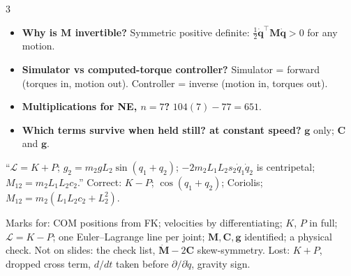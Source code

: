 \begin{multicols}{3}
\begin{itemize}
\item \textbf{Why is $\mathbf M$ invertible?} Symmetric positive definite: $\tfrac12\dot{\mathbf q}^\top\mathbf M\dot{\mathbf q}>0$ for any motion.
\item \textbf{Simulator vs computed-torque controller?} Simulator = forward (torques in, motion out). Controller = inverse (motion in, torques out).
\item \textbf{Multiplications for NE, $n=7$?} $104(7)-77=651$.
\item \textbf{Which terms survive when held still? at constant speed?} $\mathbf g$ only; $\mathbf C$ and $\mathbf g$.
\end{itemize}
\begin{trap}[student's 2R]
``$\mathcal L=K+P$; $g_2=m_2gL_2\sin(q_1{+}q_2)$; $-2m_2L_1L_2s_2\dot q_1\dot q_2$ is centripetal; $M_{12}=m_2L_1L_2c_2$.'' Correct: $K-P$; $\cos(q_1{+}q_2)$; Coriolis; $M_{12}=m_2(L_1L_2c_2+L_2^2)$.
\end{trap}
Marks for: COM positions from FK; velocities by differentiating; $K$, $P$ in full; $\mathcal L=K-P$; one Euler--Lagrange line per joint; $\mathbf M,\mathbf C,\mathbf g$ identified; a physical check. Not on slides: the check list, $\dot{\mathbf M}-2\mathbf C$ skew-symmetry. Lost: $K+P$, dropped cross term, $d/dt$ taken before $\partial/\partial\dot q$, gravity sign.
\end{multicols}
